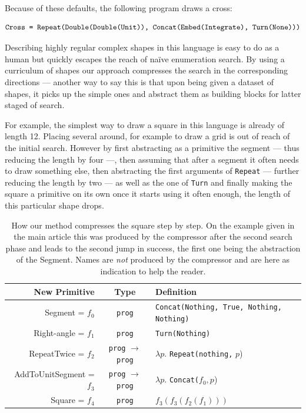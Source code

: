 \documentclass{article}
\begin{document}
Because of these defaults, the following program draws a cross:

\[
  \text{\texttt{Cross = Repeat(Double(Double(Unit)), Concat(Embed(Integrate), Turn(None)))}}
\]

Describing highly regular complex shapes in this language is easy to do as a
human but quickly escapes the reach of naïve enumeration search. By using a
curriculum of shapes our approach compresses the search in the corresponding
directions --- another way to say this is that upon being given a dataset of
shapes, it picks up the simple ones and abstract them as building blocks for
latter staged of search.

For example, the simplest way to draw a square in this language is already of
length 12. Placing several around, for example to draw a grid is out of reach of
the initial search. However by first abstracting as a primitive the segment ---
thus reducing the length by four ---, then assuming that after a segment it
often needs to draw something else, then abstracting the first arguments of
\texttt{Repeat} --- further reducing the length by two --- as well as the one of
\texttt{Turn} and finally making the square a primitive on its own once it
starts using it often enough, the length of this particular shape drops.

\begin{table}[htbp]
  \begin{center}
    \begin{tabular}{rcl}
      \toprule
      New Primitive & Type & Definition \\
      \midrule
      Segment = $f_0$ & \texttt{prog} & \texttt{Concat(Nothing, True, Nothing, Nothing)} \\
      Right-angle = $f_1$ & \texttt{prog} & \texttt{Turn(Nothing)} \\
      RepeatTwice = $f_2$ & \texttt{prog} $\to$ \texttt{prog} & $\lambda p.$ \texttt{Repeat(nothing,} $p$) \\
      AddToUnitSegment = $f_3$ & \texttt{prog} $\to$ \texttt{prog} & $\lambda p.$ \texttt{Concat(}$f_0, p$) \\
      Square = $f_4$ & \texttt{prog} & $f_3(f_3(f_2(f_1)))$ \\
      \bottomrule
    \end{tabular}
  \end{center}
  \caption{How our method compresses the square step by step. On the example
  given in the main article this was produced by the compressor after the second
  search phase and leads to the second jump in success, the first one being the
  abstraction of the Segment. Names are \emph{not} produced by the compressor
  and are here as indication to help the reader.}
\end{table}
\end{document}

